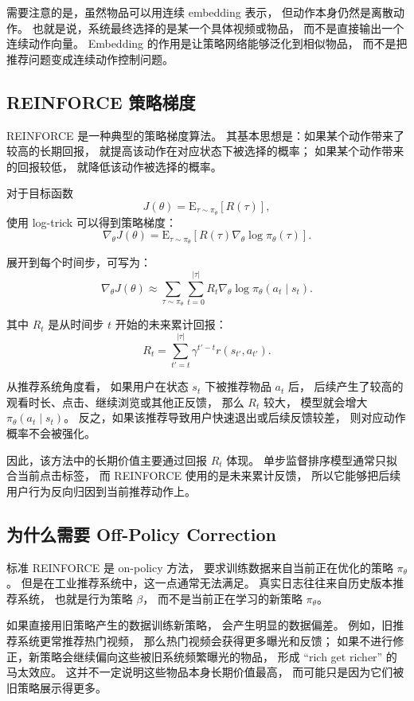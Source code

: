 \documentclass[11pt]{ctexart}
\begin{document}
需要注意的是，虽然物品可以用连续 embedding 表示，
但动作本身仍然是离散动作。
也就是说，系统最终选择的是某一个具体视频或物品，
而不是直接输出一个连续动作向量。
Embedding 的作用是让策略网络能够泛化到相似物品，
而不是把推荐问题变成连续动作控制问题。

\subsection{REINFORCE 策略梯度}

REINFORCE 是一种典型的策略梯度算法。
其基本思想是：如果某个动作带来了较高的长期回报，
就提高该动作在对应状态下被选择的概率；
如果某个动作带来的回报较低，
就降低该动作被选择的概率。

对于目标函数
\[
J(\theta)
=
\mathrm{E}_{\tau\sim \pi_{\theta}}
\left[
R(\tau)
\right],
\]
使用 log-trick 可以得到策略梯度：
\[
\nabla_{\theta}J(\theta)
=
\mathrm{E}_{\tau\sim \pi_{\theta}}
\left[
R(\tau)\nabla_{\theta}\log \pi_{\theta}(\tau)
\right].
\]

展开到每个时间步，可写为：
\[
\nabla_{\theta}J(\theta)
\approx
\sum_{\tau\sim \pi_{\theta}}
\sum_{t=0}^{|\tau|}
R_t
\nabla_{\theta}
\log \pi_{\theta}(a_t\mid s_t).
\]

其中 $R_t$ 是从时间步 $t$ 开始的未来累计回报：
\[
R_t
=
\sum_{t'=t}^{|\tau|}
\gamma^{t'-t}r(s_{t'},a_{t'}).
\]

从推荐系统角度看，
如果用户在状态 $s_t$ 下被推荐物品 $a_t$ 后，
后续产生了较高的观看时长、点击、继续浏览或其他正反馈，
那么 $R_t$ 较大，
模型就会增大 $\pi_{\theta}(a_t\mid s_t)$。
反之，如果该推荐导致用户快速退出或后续反馈较差，
则对应动作概率不会被强化。

因此，该方法中的长期价值主要通过回报 $R_t$ 体现。
单步监督排序模型通常只拟合当前点击标签，
而 REINFORCE 使用的是未来累计反馈，
所以它能够把后续用户行为反向归因到当前推荐动作上。

\subsection{为什么需要 Off-Policy Correction}

标准 REINFORCE 是 on-policy 方法，
要求训练数据来自当前正在优化的策略 $\pi_{\theta}$。
但是在工业推荐系统中，这一点通常无法满足。
真实日志往往来自历史版本推荐系统，
也就是行为策略 $\beta$，
而不是当前正在学习的新策略 $\pi_{\theta}$。

如果直接用旧策略产生的数据训练新策略，
会产生明显的数据偏差。
例如，旧推荐系统更常推荐热门视频，
那么热门视频会获得更多曝光和反馈；
如果不进行修正，新策略会继续偏向这些被旧系统频繁曝光的物品，
形成 ``rich get richer'' 的马太效应。
这并不一定说明这些物品本身长期价值最高，
而可能只是因为它们被旧策略展示得更多。
\end{document}
